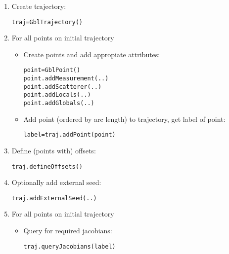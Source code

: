   \begin{enumerate}

  \setlength{\parskip}{0.5ex}
    \item Create trajectory:

\begin{alltt}
       traj = GblTrajectory()\end{alltt}

    \item For all points on initial trajectory

      \begin{itemize}
      \setlength{\parskip}{0.6ex}
        \item Create points and add appropiate attributes:

\begin{alltt}
   point = GblPoint()
   point.addMeasurement(..)
   point.addScatterer(..)
   point.addLocals(..)
   point.addGlobals(..)\end{alltt}

        \item Add point (ordered by arc length) to trajectory, get label of 
          point:

\begin{alltt}
   label = traj.addPoint(point)\end{alltt}

      \end{itemize}

    \item Define (points with) offsets:

\begin{alltt}
       traj.defineOffsets()\end{alltt}

    \item Optionally add external seed:

\begin{alltt}
       traj.addExternalSeed(..)\end{alltt}

    \item For all points on initial trajectory

      \begin{itemize}
      \setlength{\parskip}{0.6ex}
        \item Query for required jacobians:

\begin{alltt}
   traj.queryJacobians(label)         \end{alltt}


\end{itemize}
\end{enumerate}
